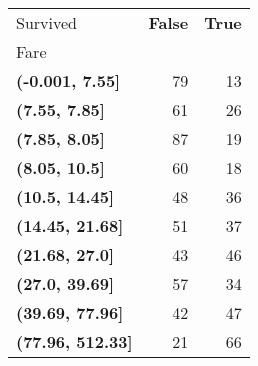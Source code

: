 \begin{tabular}{lrr}
\toprule
Survived & \textbf{False} & \textbf{True} \\
Fare &  &  \\
\midrule
\textbf{(-0.001, 7.55]} & 79 & 13 \\
\textbf{(7.55, 7.85]} & 61 & 26 \\
\textbf{(7.85, 8.05]} & 87 & 19 \\
\textbf{(8.05, 10.5]} & 60 & 18 \\
\textbf{(10.5, 14.45]} & 48 & 36 \\
\textbf{(14.45, 21.68]} & 51 & 37 \\
\textbf{(21.68, 27.0]} & 43 & 46 \\
\textbf{(27.0, 39.69]} & 57 & 34 \\
\textbf{(39.69, 77.96]} & 42 & 47 \\
\textbf{(77.96, 512.33]} & 21 & 66 \\
\bottomrule
\end{tabular}
